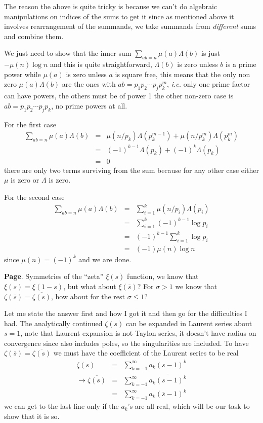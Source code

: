 \documentclass[aps,preprint,preprintnumbers,nofootinbib,showpacs,prd]{revtex4-1}
\newcommand{\ie}{{\it i.e.} }
\newcommand{\nbea}{\begin{eqnarray*}}
\newcommand{\neea}{\end{eqnarray*}}
\begin{document}
The reason the above is quite tricky is because we can't do algebraic manipulations on indices of the sums to get it since as mentioned above it involves rearrangement of the summands, we take summands from {\it different} sums and combine them.

We just need to show that the inner sum $\sum_{ab=n} \mu(a) \Lambda(b)$ is just $-\mu(n)\log n$ and this is quite straightforward, $\Lambda(b)$ is zero unless $b$ is a prime power while $\mu(a)$ is zero unless $a$ is square free, this means that the only non zero $\mu(a)\Lambda(b)$ are the ones with $ab = p_1 p_2 \cdots p_j p_k^m$, \ie only one prime factor can have powers, the others must be of power 1 the other non-zero case is $ab = p_1 p_2 \cdots p_j p_k$, no prime powers at all.

For the first case
%
\nbea
\sum_{ab=n} \mu(a) \Lambda(b) & = & \mu(n/p_k) \Lambda(p_k^{m-1}) + \mu(n/p_k^m) \Lambda(p_k^m) \\
& = & (-1)^{k-1} \Lambda(p_k) + (-1)^{k} \Lambda(p_k) \\
& = & 0
\neea
%
there are only two terms surviving from the sum because for any other case either $\mu$ is zero or $\Lambda$ is zero.

For the second case
%
\nbea
\sum_{ab=n} \mu(a) \Lambda(b) & = & \sum_{i=1}^k \mu(n/p_i)\Lambda(p_i) \\
& = & \sum_{i=1}^k (-1)^{k-1} \log p_i \\
& = & (-1)^{k-1} \sum_{i=1}^k \log p_i \\
& = & (-1) \mu(n) \log n
\neea
%
since $\mu(n) = (-1)^{k}$ and we are done.




{\bf Page}. Symmetries of the ``zeta'' $\xi(s)$ function, we know that $\xi(s) = \xi(1-s)$, but what about $\xi(\overline{s})$? For $\sigma > 1$ we know that $\zeta(\overline{s}) = \overline{\zeta(s)}$, how about for the rest $\sigma \le 1$?

Let me state the answer first and how I got it and then go for the difficulties I had. The analytically continued $\zeta(s)$ can be expanded in Laurent series about $s=1$, note that Laurent expansion is not Taylon series, it doesn't have radius on convergence since also includes poles, so the singularities are included. To have $\zeta(\overline{s}) = \overline{\zeta(s)}$ we must have the coefficient of the Laurent series to be real
%
\nbea
\zeta(s) & = & \sum_{k=-1}^\infty a_k (s-1)^k \\
\to \overline{\zeta(s)} & = & \sum_{k=-1}^\infty \overline{a_k (s-1)^k} \\
& = & \sum_{k=-1}^\infty a_k (\overline{s}-1)^k
\neea
%
we can get to the last line only if the $a_k$'s are all real, which will be our task to show that it is so.
\end{document}
